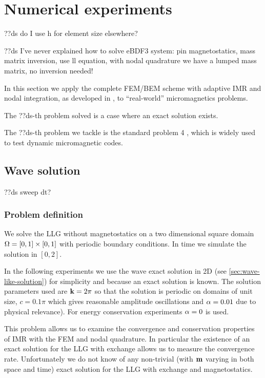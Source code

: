 \chapter{Numerical experiments}
\label{cha:numer-experiments}

??ds do I use h for element size elsewhere?

??ds I've never explained how to solve eBDF3 system: pin magnetostatics, mass matrix inversion, use ll equation, with nodal quadrature we have a lumped mass matrix, no inversion needed!

In this section we apply the complete FEM/BEM scheme with adaptive IMR and nodal integration, as developed in , to ``real-world'' micromagnetics problems.

The ??ds-th problem solved is a case where an exact solution exists.

The ??ds-th problem we tackle is the \mumag standard problem 4 \cite{mumag-website}, which is widely used to test dynamic micromagnetic codes.



\section{Wave solution}
\label{sec:numer-exper}


??ds sweep dt?

\subsection{Problem definition}

We solve the LLG without magnetostatics on a two dimensional square domain $\Omega = [0,1] \times [0,1]$ with periodic boundary conditions.
In time we simulate the solution in $[0, 2]$.

In the following experiments we use the wave exact solution in 2D (see \cref{sec:wave-like-solution}) for simplicity and because an exact solution is known.
The solution parameters used are $\boldsymbol{\mathrm{k}} = 2\pi$ so that the solution is periodic on domains of unit size, $c = 0.1\pi$ which gives reasonable amplitude oscillations and $\alpha = 0.01$ due to physical relevance).
For energy conservation experiments $\alpha = 0$ is used.


This problem allows us to examine the convergence and conservation properties of IMR with the FEM and nodal quadrature.
In particular the existence of an exact solution for the LLG with exchange allows us to measure the convergence rate.
Unfortunately we do not know of any non-trivial (\ie with $\boldsymbol{\mathrm{m}}$ varying in both space and time) exact solution for the LLG with exchange and magnetostatics.


